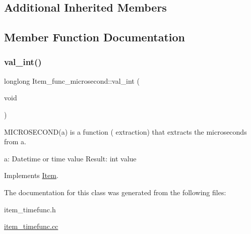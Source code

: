 \subsection*{Additional Inherited Members}


\subsection{Member Function Documentation}
\mbox{\label{classItem__func__microsecond_a403605632409cffe230b4586f567ab98}} 
\subsubsection{\texorpdfstring{val\+\_\+int()}{val\_int()}}
{\footnotesize\ttfamily longlong Item\+\_\+func\+\_\+microsecond\+::val\+\_\+int (\begin{DoxyParamCaption}\item[{void}]{ }\end{DoxyParamCaption})\hspace{0.3cm}{\ttfamily [virtual]}}

M\+I\+C\+R\+O\+S\+E\+C\+O\+N\+D(a) is a function ( extraction) that extracts the microseconds from a.

a\+: Datetime or time value Result\+: int value 

Implements \mbox{\hyperlink{classItem}{Item}}.



The documentation for this class was generated from the following files\+:\begin{DoxyCompactItemize}
\item 
item\+\_\+timefunc.\+h\item 
\mbox{\hyperlink{item__timefunc_8cc}{item\+\_\+timefunc.\+cc}}\end{DoxyCompactItemize}
